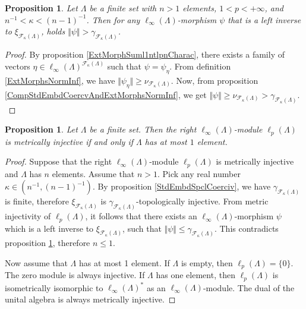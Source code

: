 \documentclass[12pt]{article}
\newtheorem{proposition}[theorem]{Proposition}
\begin{document}
\begin{proposition}\label{RetrPrblmNoSln}
    Let $\Lambda$ be a finite set with $n>1$ elements, $1<p<+\infty$, 
    and $n^{-1}<\kappa<(n-1)^{-1}$. Then for any $\ell_\infty(\Lambda)$-morphism
    $\psi$ that is a left inverse to $\xi_{\mathcal{F}_{\kappa}(\Lambda)}$, 
    holds $\Vert \psi\Vert>\gamma_{\mathcal{F}_{\kappa}(\Lambda)}$.  
\end{proposition}
\begin{proof}
    By proposition \ref{ExtMorphSuml1ntlpnCharac}, there exists a family of 
    vectors $\eta\in\ell_\infty(\Lambda)^{\mathcal{F}_{\kappa}(\Lambda)}$ such 
    that $\psi=\psi_{\eta}$. From definition \ref{ExtMorphsNormInf}, we 
    have $\Vert \psi_{\eta}\Vert\geq \nu_{\mathcal{F}_{\kappa}(\Lambda)}$. Now, 
    from proposition \ref{CompStdEmbdCoercvAndExtMorphsNormInf}, we get 
    $
    \Vert\psi\Vert\geq\nu_{\mathcal{F}_{\kappa}(\Lambda)}
    >
    \gamma_{\mathcal{F}_{\kappa}(\Lambda)}.
    $
\end{proof}

\begin{proposition}\label{linftnModlpnIsntMetInjCharac}
    Let $\Lambda$ be a finite set. Then the right $\ell_\infty(\Lambda)$-module 
    $\ell_p(\Lambda)$ is metrically injective if and only if $\Lambda$ has at 
    most $1$ element.
\end{proposition}
\begin{proof}
    Suppose that the right $\ell_\infty(\Lambda)$-module $\ell_p(\Lambda)$ is 
    metrically injective and $\Lambda$ has $n$ elements. Assume that $n>1$. 
    Pick any real number $\kappa\in(n^{-1},(n-1)^{-1})$. By 
    proposition \ref{StdEmbdSpclCoerciv}, we 
    have $\gamma_{\mathcal{F}_{\kappa}(\Lambda)}$ is finite, 
    therefore $\xi_{\mathcal{F}_{\kappa}(\Lambda)}$ 
    is $\gamma_{\mathcal{F}_{\kappa}(\Lambda)}$-topologically injective. 
    From metric injectivity of $\ell_p(\Lambda)$, it follows that there exists 
    an $\ell_\infty(\Lambda)$-morphism $\psi$ which is a left inverse 
    to $\xi_{\mathcal{F}_{\kappa}(\Lambda)}$, such 
    that $\Vert\psi\Vert\leq \gamma_{\mathcal{F}_{\kappa}(\Lambda)}$. 
    This contradicts proposition \ref{linftnModlpnIsntMetInjCharac}, 
    therefore $n\leq 1$.

    Now assume that $\Lambda$ has at most 1 element. If $\Lambda$ is empty, then
    $\ell_p(\Lambda)=\{0\}$. The zero module is always injective. If $\Lambda$ 
    has one element, then $\ell_p(\Lambda)$ is isometrically isomorphic 
    to $\ell_\infty(\Lambda)^*$ as an $\ell_\infty(\Lambda)$-module. The dual of
    the unital algebra is always metrically injective.
\end{proof}
\end{document}
